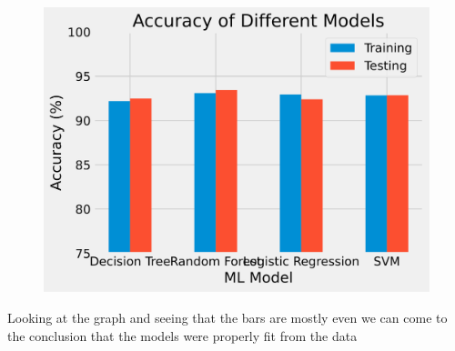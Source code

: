 \documentclass[
  letterpaper,
  DIV=11,
  numbers=noendperiod]{scrartcl}
\begin{document}
\begin{figure}[H]

{\centering \includegraphics{project_files/figure-pdf/cell-44-output-2.svg}

}

\end{figure}

Looking at the graph and seeing that the bars are mostly even we can
come to the conclusion that the models were properly fit from the data
\end{document}
